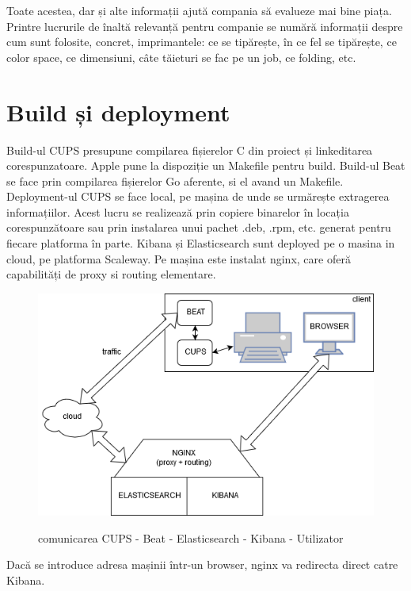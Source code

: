 \documentclass[a4paper, 12pt, twoside]{report}
\begin{document}
\bigskip
\bigskip

Toate acestea, dar și alte informații ajută compania să evalueze mai bine piața. Printre lucrurile de înaltă relevanță pentru companie se numără informații despre cum sunt folosite, concret, imprimantele: ce se tipărește, în ce fel se tipărește, ce color space, ce dimensiuni, câte tăieturi se fac pe un job, ce folding, etc. 
		


	\section{Build și deployment}
	Build-ul CUPS presupune compilarea fișierelor C din proiect și linkeditarea corespunzatoare. Apple pune la dispoziție un Makefile pentru build. Build-ul Beat se face prin compilarea fișierelor Go aferente, si el avand un Makefile.
	Deployment-ul CUPS se face local, pe mașina de unde se urmărește extragerea informațiilor. Acest lucru se realizează prin copiere binarelor în locația corespunzătoare sau prin instalarea unui pachet .deb, .rpm, etc. generat pentru fiecare platforma în parte.
	Kibana și Elasticsearch sunt deployed pe o masina in cloud, pe platforma Scaleway. Pe mașina este instalat nginx, care oferă capabilități de proxy si routing elementare.
	\begin{figure}
		\centering
		{\includegraphics[width=130mm]{cups-cloud.png}}
	\caption{comunicarea CUPS - Beat - Elasticsearch - Kibana - Utilizator}
	\end{figure}	
	Dacă se introduce adresa mașinii într-un browser, nginx va redirecta direct catre Kibana.
\end{document}
